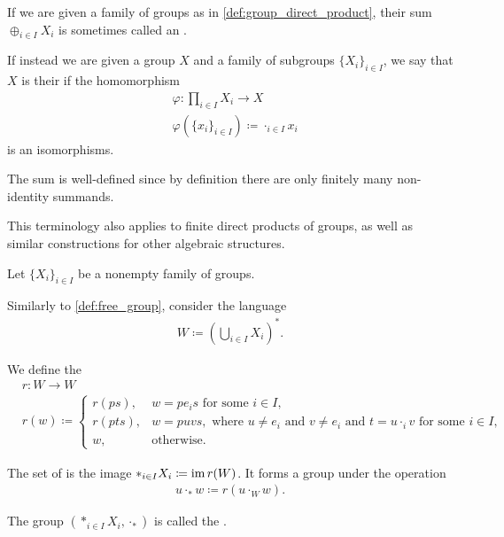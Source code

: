 \begin{note}\label{def:group_direct_sum_external_internal}\cite[126]{Knapp2016BAlg}
  If we are given a family of groups as in \cref{def:group_direct_product}, their sum \( \oplus_{i \in I} X_i \) is sometimes called an .

  If instead we are given a group \( X \) and a family of subgroups \( \{ X_i \}_{i \in I} \), we say that \( X \) is their  if the homomorphism
  \begin{align*}
    &\varphi: \prod_{i \in I} X_i \to X \\
    &\varphi(\{ x_i \}_{i \in I}) \coloneqq \cdot_{i \in I} x_i
  \end{align*}
  is an isomorphisms.

  The sum is well-defined since by definition there are only finitely many non-identity summands.

  This terminology also applies to finite direct products of groups, as well as similar constructions for other algebraic structures.
\end{note}

\begin{definition}\label{def:group_free_product}\cite[323]{Knapp2016BAlg}
  Let \( \{ X_i \}_{i \in I} \) be a nonempty family of groups.

  Similarly to \cref{def:free_group}, consider the language
  \begin{align*}
    W \coloneqq \left( \bigcup_{i \in I} X_i \right)^{*}.
  \end{align*}

  We define the 
  \begin{align*}
    &r: W \to W \\
    &r(w) \coloneqq \begin{cases}
      r(ps), &w = p e_i s \text{ for some } i \in I, \\
      r(pts), &w = puvs, \text{ where } u \neq e_i \text{ and } v \neq e_i \text{ and } t = u \cdot_i v \text{ for some } i \in I, \\
      w, &\text{otherwise}.
    \end{cases}
  \end{align*}

  The set of  is the image \( \ast_{i \in I} X_i \coloneqq \operatorname{im} r(W) \). It forms a group under the operation
  \begin{align*}
    u \cdot_\ast w \coloneqq r(u \cdot_{W} w).
  \end{align*}

  The group \( (\ast_{i \in I} X_i, \cdot_\ast) \) is called the .
\end{definition}

